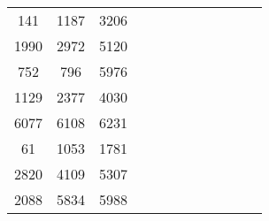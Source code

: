 \begin{table}[tb]
\begin{tabular}{|c|c|c|ccccccccc}
		141  & 1187 & 3206 &                           &                           &                           &                           &                           &                           &                           &                           &                           \\ \cline{1-3}
		1990 & 2972 & 5120 &                           &                           &                           &                           &                           &                           &                           &                           &                           \\ \cline{1-3}
		752  & 796  & 5976 &                           &                           &                           &                           &                           &                           &                           &                           &                           \\ \cline{1-3}
		1129 & 2377 & 4030 &                           &                           &                           &                           &                           &                           &                           &                           &                           \\ \cline{1-3}
		6077 & 6108 & 6231 &                           &                           &                           &                           &                           &                           &                           &                           &                           \\ \cline{1-3}
		61   & 1053 & 1781 &                           &                           &                           &                           &                           &                           &                           &                           &                           \\ \cline{1-3}
		2820 & 4109 & 5307 &                           &                           &                           &                           &                           &                           &                           &                           &                           \\ \cline{1-3}
		2088 & 5834 & 5988 &                           &                           &                           &                           &                           &                           &                           &                           &                           \\ \cline{1-3}

\end{tabular}
\end{table}
